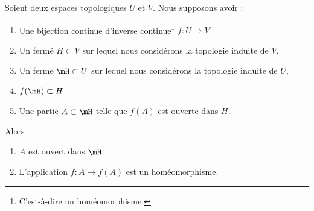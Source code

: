 \begin{lemma}	\label{LEMooGANPooUJZmnM}
	Soient deux espaces topologiques \( U\) et \( V\). Nous supposons avoir :
	\begin{enumerate}
		\item
		      Une bijection continue d'inverse continue\footnote{C'est-à-dire un homéomorphisme.} \(f \colon U\to V  \)
		\item
		      Un fermé \( H\subset V\) sur lequel nous considérons la topologie induite de \( V\),
		\item
		      Un ferme \( \mH\subset U\) sur lequel nous considérons la topologie induite de \( U\),
		\item
		      \( f(\mH)\subset H\)
		\item
		      Une partie \( A\subset\mH\) telle que \( f(A)\) est ouverte dans \( H\).
	\end{enumerate}
	Alors
	\begin{enumerate}
		\item		\label{ITEMooIYGLooTrxugS}
		      \( A\) est ouvert dans \( \mH\).
		\item	\label{ITEMooDZHUooFJRRfi}
		      L'application \(f \colon A\to f(A)  \) est un homéomorphisme.
	\end{enumerate}

\end{lemma}

